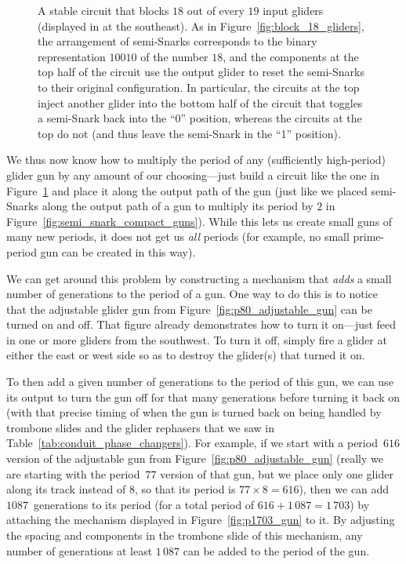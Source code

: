 \begin{figure}[!htb]
	\centering
	\caption{A stable circuit that blocks $18$ out of every $19$ input gliders (displayed in  at the southeast). As in Figure~\ref{fig:block_18_gliders}, the arrangement of semi-Snarks corresponds to the binary representation $10010$ of the number $18$, and the components at the top half of the circuit use the output glider to reset the semi-Snarks to their original configuration. In particular, the  circuits at the top inject another glider into the bottom half of the circuit that toggles a semi-Snark back into the ``0'' position, whereas the  circuits at the top do not (and thus leave the semi-Snark in the ``1'' position).}
	\label{fig:block_18_gliders_repeatable}
\end{figure}

We thus now know how to multiply the period of any (sufficiently high-period) glider gun by any amount of our choosing---just build a circuit like the one in Figure~\ref{fig:block_18_gliders_repeatable} and place it along the output path of the gun (just like we placed semi-Snarks along the output path of a gun to multiply its period by $2$ in Figure~\ref{fig:semi_snark_compact_guns}). While this lets us create small guns of many new periods, it does not get us \emph{all} periods (for example, no small prime-period gun can be created in this way).

We can get around this problem by constructing a mechanism that \emph{adds} a small number of generations to the period of a gun. One way to do this is to notice that the adjustable glider gun from Figure~\ref{fig:p80_adjustable_gun} can be turned on and off. That figure already demonstrates how to turn it on---just feed in one or more gliders from the southwest. To turn it off, simply fire a glider at either the east or west side so as to destroy the glider(s) that turned it on.

To then add a given number of generations to the period of this gun, we can use its output to turn the gun off for that many generations before turning it back on (with that precise timing of when the gun is turned back on being handled by trombone slides and the glider rephasers that we saw in Table~\ref{tab:conduit_phase_changers}). For example, if we start with a period~$616$ version of the adjustable gun from Figure~\ref{fig:p80_adjustable_gun} (really we are starting with the period~$77$ version of that gun, but we place only one glider along its track instead of $8$, so that its period is $77 \times 8 = 616$), then we can add $1 087$~generations to its period (for a total period of $616+1\, 087 = 1\, 703$) by attaching the mechanism displayed in Figure~\ref{fig:p1703_gun} to it. By adjusting the spacing and components in the trombone slide of this mechanism, any number of generations at least $1\, 087$ can be added to the period of the gun.

